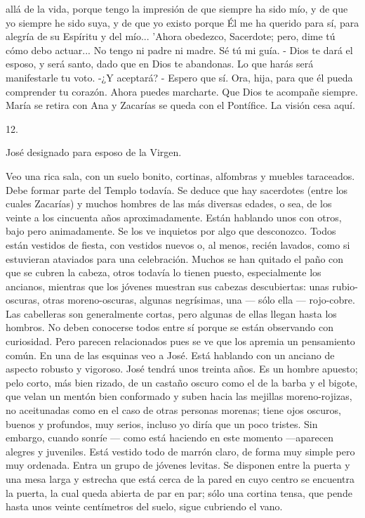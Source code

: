 \documentclass[12pt]{book} %
\begin{document}
allá de la vida, porque tengo la impresión de que siempre ha sido mío, y de que yo siempre he sido suya, y de que yo existo porque Él me ha querido para sí, para alegría de su Espíritu y del mío... 'Ahora obedezco, Sacerdote; pero, dime tú cómo debo actuar... No tengo ni padre ni madre. Sé tú mi guía. - Dios te dará el esposo, y será santo, dado que en Dios te abandonas. Lo que harás será manifestarle tu voto. 
-¿Y aceptará? 
- Espero que sí. Ora, hija, para que él pueda comprender tu corazón. Ahora puedes marcharte. Que Dios te acompañe siempre. 
María se retira con Ana y Zacarías se queda con el Pontífice. La visión cesa aquí. 
 
12. 
 
José designado para esposo de la Virgen. 
 
Veo una rica sala, con un suelo bonito, cortinas, alfombras y muebles taraceados. Debe formar parte del Templo todavía. Se deduce que hay sacerdotes (entre los cuales Zacarías) y muchos hombres de las más diversas edades, o sea, de los veinte a los cincuenta años aproximadamente. 
Están hablando unos con otros, bajo pero animadamente. Se los ve inquietos por algo que desconozco. Todos están 
vestidos de fiesta, con vestidos nuevos o, al menos, recién lavados, como si estuvieran ataviados para una celebración. Muchos se han quitado el paño con que se cubren la cabeza, otros todavía lo tienen puesto, especialmente los ancianos, mientras que los jóvenes muestran sus cabezas descubiertas: unas rubio-oscuras, otras moreno-oscuras, algunas negrísimas, una — sólo ella — rojo-cobre. Las cabelleras son generalmente cortas, pero algunas de ellas llegan hasta los hombros. No deben conocerse todos entre sí porque se están observando con curiosidad. Pero parecen relacionados pues se ve que los apremia un pensamiento común. 
En una de las esquinas veo a José. Está hablando con un anciano de aspecto robusto y vigoroso. José tendrá unos 
treinta años. Es un hombre apuesto; pelo corto, más bien rizado, de un castaño oscuro como el de la barba y el bigote, que velan un mentón bien conformado y suben hacia las mejillas moreno-rojizas, no aceitunadas como en el caso de otras personas morenas; tiene ojos oscuros, buenos y profundos, muy serios, incluso yo diría que un poco tristes. Sin embargo, cuando sonríe — como está haciendo en este momento —aparecen alegres y juveniles. Está vestido todo de marrón claro, de forma muy simple pero muy ordenada. 
Entra un grupo de jóvenes levitas. Se disponen entre la puerta y una mesa larga y estrecha que está cerca de la pared 
en cuyo centro se encuentra la puerta, la cual queda abierta de par en par; sólo una cortina tensa, que pende hasta unos veinte centímetros del suelo, sigue cubriendo el vano. 
\end{document}
